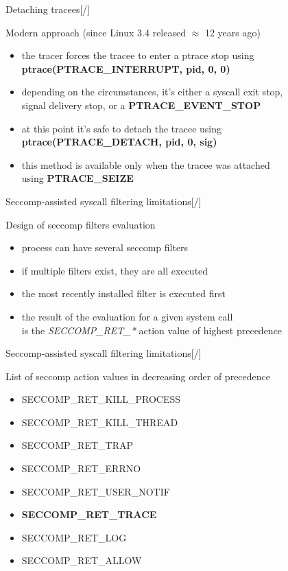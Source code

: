 \documentclass[unicode,aspectratio=169,xcolor={table,dvipsnames,usernames}]{beamer}
\begin{document}
\begin{frame}{\Large Detaching tracees\hfill [\insertframenumber/\inserttotalframenumber]}
\Large
\begin{block}{Modern approach (since Linux 3.4 released $\approx$ 12 years ago)}
\begin{itemize}
	\item the tracer forces the tracee to enter a ptrace stop using
		\textbf{ptrace(PTRACE\_INTERRUPT, pid, 0, 0)}
	\item depending on the circumstances, it's either a syscall exit stop, \\
		signal delivery stop, or a \textbf{PTRACE\_EVENT\_STOP}
	\item at this point it's safe to detach the tracee using \\
		\textbf{ptrace(PTRACE\_DETACH, pid, 0, sig)}
	\item this method is available only when the tracee was attached \\
		using \textbf{PTRACE\_SEIZE}
\end{itemize}
\end{block}
\end{frame}

\begin{frame}{\Large Seccomp-assisted syscall filtering limitations\hfill [\insertframenumber/\inserttotalframenumber]}
\Large
\begin{block}{Design of seccomp filters evaluation}
\begin{itemize}
	\item process can have several seccomp filters
	\item if multiple filters exist, they are all executed
	\item the most recently installed filter is executed first
	\item the result of the evaluation for a given system call \\
		is the \textit{SECCOMP\_RET\_*} action value of highest precedence
\end{itemize}
\end{block}
\end{frame}

\begin{frame}{\Large Seccomp-assisted syscall filtering limitations\hfill [\insertframenumber/\inserttotalframenumber]}
\Large
\begin{block}{List of seccomp action values in decreasing order of precedence}
\begin{itemize}
	\item SECCOMP\_RET\_KILL\_PROCESS
	\item SECCOMP\_RET\_KILL\_THREAD
	\item SECCOMP\_RET\_TRAP
	\item SECCOMP\_RET\_ERRNO
	\item SECCOMP\_RET\_USER\_NOTIF
	\item \textbf{SECCOMP\_RET\_TRACE}
	\item SECCOMP\_RET\_LOG
	\item SECCOMP\_RET\_ALLOW
\end{itemize}
\end{block}
\end{frame}
\end{document}

